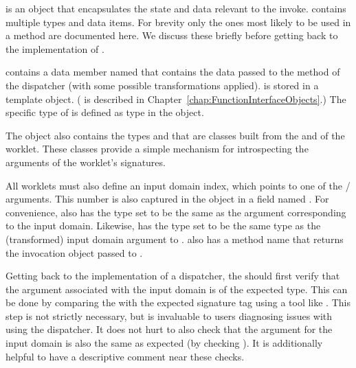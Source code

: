 

 is an object that encapsulates the state and data relevant to the invoke.
 contains multiple types and data items.
For brevity only the ones most likely to be used in a  method are documented here.
We discuss these briefly before getting back to the implementation of .

 contains a data member named  that contains the data passed to the  method of the dispatcher (with some possible transformations applied).
 is stored in a  template object.
( is described in Chapter~\ref{chap:FunctionInterfaceObjects}.)
The specific type of  is defined as type  in the  object.

The  object also contains the types  and  that are  classes built from the \controlsignature and \executionsignature of the worklet.
These  classes provide a simple mechanism for introspecting the arguments of the worklet's signatures.

All worklets must also define an input domain index, which points to one of the \controlsignature/ arguments.
This number is also captured in the  object in a field named .
For convenience,  also has the type  set to be the same as the \controlsignature argument corresponding to the input domain.
Likewise,  has the type  set to be the same type as the (transformed) input domain argument to .
 also has a method name  that returns the invocation object passed to .


Getting back to the implementation of a dispatcher, the  should first verify that the \controlsignature argument associated with the input domain is of the expected type.
This can be done by comparing the  with the expected signature tag using a tool like .
This step is not strictly necessary, but is invaluable to users diagnosing issues with using the dispatcher.
It does not hurt to also check that the  argument for the input domain is also the same as expected (by checking ).
It is additionally helpful to have a descriptive comment near these checks.

